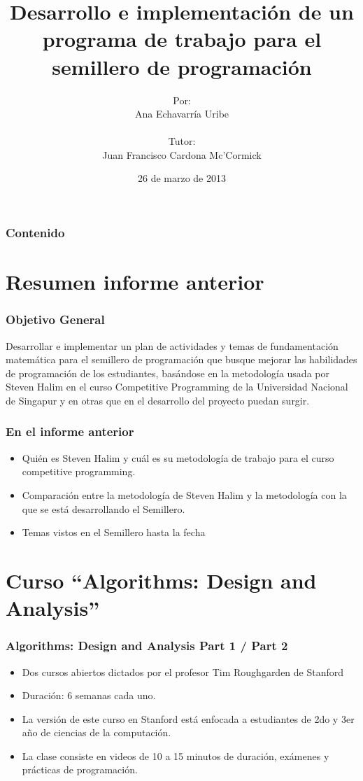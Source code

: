 \documentclass{beamer}
\title{Desarrollo e implementación de un programa de trabajo para el semillero de programación}
\author{Por: \\ Ana Echavarría Uribe \\ \quad \\ Tutor: \\ Juan Francisco Cardona Mc'Cormick}
\institute{Universidad EAFIT}
\date{26 de marzo de 2013}
\begin{document}
\begin{frame}
	\titlepage
\end{frame}

\begin{frame}
	\frametitle{Contenido}
	\tableofcontents
\end{frame}

\section[Informe anterior]{Resumen informe anterior}

	\begin{frame}
		\frametitle{Objetivo General}
		\begin{block}{}
			Desarrollar e implementar un plan de actividades y temas de fundamentación matemática para el semillero de programación que busque mejorar las habilidades de programación de los estudiantes, basándose en la metodología usada por Steven Halim en el curso Competitive Programming de la Universidad Nacional de Singapur y en otras que en el desarrollo del proyecto puedan surgir.
		\end{block}
	\end{frame}
	
	\begin{frame}
		\frametitle{En el informe anterior}
		\begin{itemize}
			\item Quién es Steven Halim y cuál es su metodología de trabajo para el curso competitive programming.
			\item Comparación entre la metodología de Steven Halim y la metodología con la que se está desarrollando el Semillero.
			\item Temas vistos en el Semillero hasta la fecha
		\end{itemize}
	\end{frame}

\section[Curso Stanford]{Curso ``Algorithms: Design and Analysis'' }

	\begin{frame}
		\frametitle{Algorithms: Design and Analysis Part 1 / Part 2}
		\begin{itemize}
			\item Dos cursos abiertos dictados por el profesor Tim Roughgarden de Stanford
			\item Duración: 6 semanas cada uno.
			\item La versión de este curso en Stanford está enfocada a estudiantes de 2do y 3er año de ciencias de la computación.
			\item La clase consiste en videos de 10 a 15 minutos de duración, exámenes y prácticas de programación.
		\end{itemize}	
	\end{frame}
	
\end{document}
